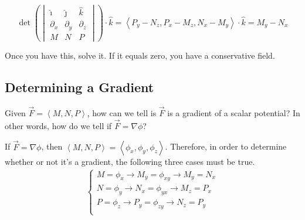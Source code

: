 \documentclass{article}
\newcommand{\nvec}[1]{\left\langle #1 \right\rangle}
\begin{document}
    \begin{equation}
    \det \left(
    \begin{vmatrix}
    \hat{\imath} & \hat{\jmath} & \hat{k}\\
    \partial_x & \partial_y & \partial_z\\
    M & N & P
    \end{vmatrix}\right)
    \cdot \hat{k}
    =
    \nvec{P_y - N_z, P_x - M_z, N_x - M_y} \cdot \hat{k}
    =
    M_y - N_x
    \end{equation}

    Once you have this, solve it. If it equals zero, you have a conservative field.

    \subsection{Determining a Gradient}
    Given $\vec{F} = \nvec{M, N, P}$, how can we tell is $\vec{F}$ is a gradient of a scalar potential? In other words, how do we tell if $\vec{F}=\nabla\phi$?

    If $\vec{F}=\nabla\phi$, then $\nvec{M, N, P} = \nvec{\phi_x, \phi_y, \phi_z}$.
    Therefore, in order to determine whether or not it's a gradient, the following three cases must be true.
    \[
    \begin{aligned}
    \begin{cases}
        M = \phi_x \to M_y = \phi_{xy} \to M_y = N_x\\
        N = \phi_y \to N_x = \phi_{yx} \to M_z = P_x\\
        P = \phi_z \to P_y = \phi_{zy} \to N_z = P_y\\
    \end{cases}
    \end{aligned}
    \]
\end{document}
